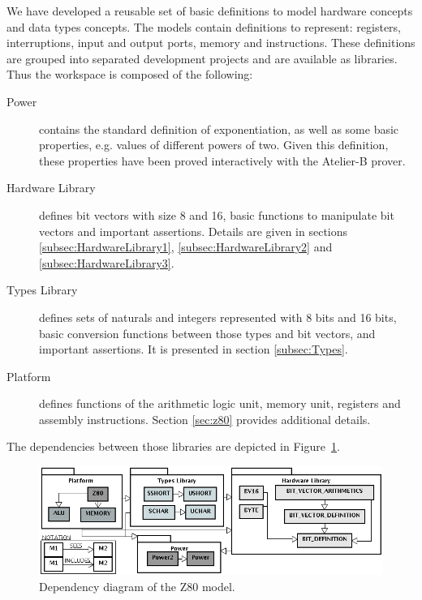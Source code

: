 \documentclass[a4paper]{llncs}
\begin{document}
We have developed a reusable set of basic definitions to model
hardware concepts and data types concepts. The models contain
definitions to represent: registers, interruptions, input and
output ports, memory and instructions. These definitions are grouped
into separated development projects and are available as libraries.
Thus the workspace is composed of the following: 
\begin{description}

\item[Power] contains the standard definition of exponentiation, as
  well as some basic properties, e.g. values of different powers of
  two. Given this definition, these properties have been proved
  interactively with the Atelier-B prover.

\item[Hardware Library] defines bit vectors with size 8 and 16, basic
  functions to manipulate bit vectors and important
  assertions. Details are given in sections
  \ref{subsec:HardwareLibrary1}, \ref{subsec:HardwareLibrary2} and
  \ref{subsec:HardwareLibrary3}.
 
\item[Types Library] defines sets of naturals and integers represented
  with 8 bits and 16 bits, basic conversion functions between those
  types and bit vectors, and important assertions. It is presented in
  section \ref{subsec:Types}.
 
\item[Platform] defines functions of the arithmetic logic unit, memory
  unit, registers and assembly instructions. Section \ref{sec:z80}
  provides additional details.
 
\end{description}

The dependencies between those libraries are depicted in
Figure~\ref{fig:hardware-definition-graph}.

\begin{figure}[h]
\centering
\includegraphics[width=.85\textwidth]{diagramaEstrutural_vertical_ProB2.png}
 \caption{Dependency diagram of the Z80 model.}
\label{fig:hardware-definition-graph}
\end{figure}
\end{document}
